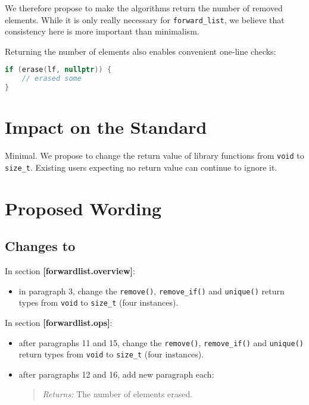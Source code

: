 \documentclass[11pt]{article}
\begin{document}
We therefore propose to make the algorithms return the number of
removed elements. While it is only really necessary for
\texttt{forward\_list}, we believe that consistency here is more
important than minimalism.

Returning the number of elements also enables convenient one-line
checks:
\begin{lstlisting}[language=C++]
if (erase(lf, nullptr)) {
    // erased some
}
\end{lstlisting}

\section{Impact on the Standard}

Minimal. We propose to change the return value of library functions
from \texttt{void} to \texttt{size\_t}. Existing users expecting no
return value can continue to ignore it.

\section{Proposed Wording}

\subsection{Changes to \cite{cpp17}}

In section \textbf{[forwardlist.overview]}:

\begin{itemize}
\item in paragraph 3, change the \texttt{remove()},
  \texttt{remove\_if()} and \texttt{unique()} return types from
  \texttt{void} to \texttt{size\_t} (four instances).
\end{itemize}

In section \textbf{[forwardlist.ops]}:

\begin{itemize}
\item after paragraphs 11 and 15, change the \texttt{remove()},
  \texttt{remove\_if()} and \texttt{unique()} return types from
  \texttt{void} to \texttt{size\_t} (four instances).
\item after paragraphs 12 and 16, add new paragraph each:
  \begin{quotation}
    \textit{Returns:} The number of elements erased.
  \end{quotation}
\end{itemize}
\end{document}
